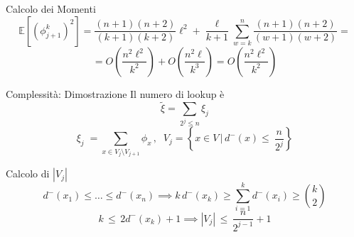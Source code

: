 \documentclass{beamer}
\begin{document}
\begin{frame}{Calcolo dei Momenti}
	\begin{equation*}
		\mathbb{E}\left[\left({\phi_{j+1}^k}\right)^2\right] = \frac{\left(n+1\right)\left(n+2\right)}{\left(k+1\right)\left(k+2\right)} \ell^2 + \frac{\ell}{k+1} \sum_{w=k}^n \frac{\left(n+1\right)\left(n+2\right)}{\left(w+1\right)\left(w+2\right)} =
	\end{equation*}
	\begin{equation*}
		= O\left(\frac{n^2\ell^2}{k^2}\right) + O\left(\frac{n^2\ell}{k^3}\right) = O\left(\frac{n^2\ell^2}{k^2}\right)
	\end{equation*}
\end{frame}

\begin{frame}{Complessità: Dimostrazione}
	Il numero di lookup è
	\begin{equation*}
		\tilde\xi = \sum_{2^j \leq n} \xi_j
	\end{equation*}
	\begin{equation*}
		\xi_j \; = \sum_{x \in V_j \setminus V_{j+1}} \phi_x\,, \; \;
		V_j = \left\{x \in V \, \bigg| \, d^-(x) \leq \ \frac{n}{2^j}\right\}
	\end{equation*}

	\pause
	\begin{block}{Calcolo di $|V_j|$}
		\begin{equation*}
			d^-(x_1) \leq  \dots \leq d^-(x_n) \implies k \, d^-(x_k) \geq \sum_{i=1}^k d^-(x_i) \geq \binom{k}{2}
		\end{equation*}
		\begin{equation*}
			k \, \leq \, 2 d^-(x_k) + 1 \implies |V_j|  \, \leq \, \frac{n}{2^{j-1}} + 1
		\end{equation*}
	\end{block}
\end{frame}
\end{document}
